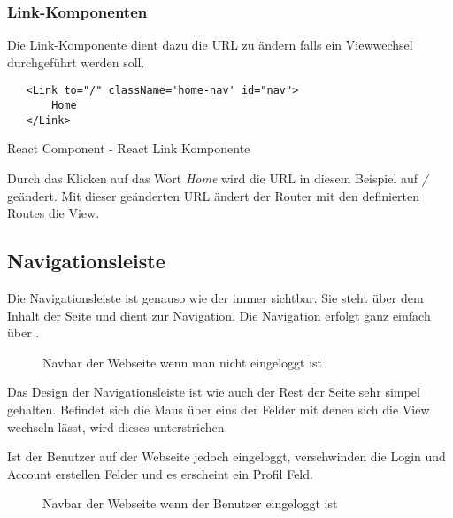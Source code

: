 \subsubsection{Link-Komponenten}
\label{React-Links}
Die Link-Komponente dient dazu die URL zu ändern falls ein Viewwechsel durchgeführt werden soll.
\begin{code}[htp]
\begin{lstlisting}
   <Link to="/" className='home-nav' id="nav">
       Home
   </Link>
\end{lstlisting}
\caption{React Component - React Link Komponente}
\end{code}
Durch das Klicken auf das Wort \textit{Home} wird die URL in diesem Beispiel auf \textit{/} geändert.
Mit dieser geänderten URL ändert der Router mit den definierten Routes die View.

\subsection{Navigationsleiste}
\label{nav}

Die Navigationsleiste ist genauso wie der \underline{} immer sichtbar. Sie steht über dem Inhalt der Seite und 
dient zur Navigation. Die Navigation erfolgt ganz einfach über \underline{}.

\begin{figure}[H]
  \begin{center}
    \caption{Navbar der Webseite wenn man nicht eingeloggt ist}
  \end{center}
\end{figure}

Das Design der Navigationsleiste ist wie auch der Rest der Seite sehr simpel gehalten. Befindet sich
die Maus über eins der Felder mit denen sich die View wechseln lässt, wird dieses unterstrichen.


Ist der Benutzer auf der Webseite jedoch eingeloggt, verschwinden die Login und Account erstellen 
Felder und es erscheint ein Profil Feld.

\begin{figure}[H]
    \begin{center}
      \caption{Navbar der Webseite wenn der Benutzer eingeloggt ist}
    \end{center}
\end{figure}

